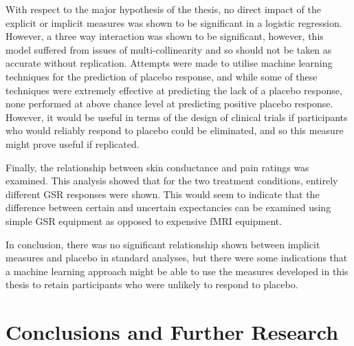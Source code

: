With respect to the major hypothesis of the thesis, no direct impact of the explicit or implicit measures was shown to be significant in a logistic regression. However, a three way interaction was shown to be significant, however, this model suffered from issues of multi-collinearity and so should not be taken as accurate without replication. Attempts were made to utilise machine learning techniques for the prediction of placebo response, and while some of these techniques were extremely effective at predicting the lack of a placebo response, none performed at above chance level at predicting positive placebo response. However, it would be useful in terms of the design of clinical trials if participants who would reliably respond to placebo could be eliminated, and so this measure might prove useful if replicated. 

Finally, the relationship between skin conductance and pain ratings was examined. This analysis showed that for the two treatment conditions, entirely different GSR responses were shown. This would seem to indicate that the difference between certain and uncertain expectancies can be examined using simple GSR equipment as opposed to expensive fMRI equipment. 

In conclusion, there was no significant relationship shown between implicit measures and placebo in standard analyses, but there were some indications that a machine learning approach might be able to use the measures developed in this thesis to retain participants who were unlikely to respond to placebo. 

\section{Conclusions and Further Research}

